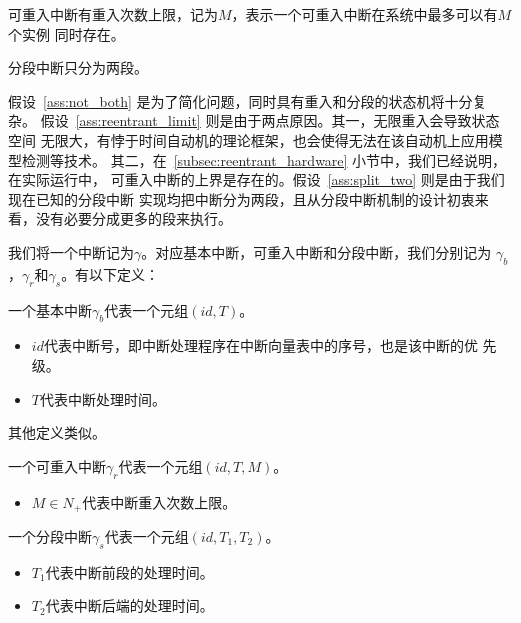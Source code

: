 \begin{assumption}
	\label{ass:reentrant_limit}
	可重入中断有重入次数上限，记为$M$，表示一个可重入中断在系统中最多可以有$M$个实例
	同时存在。
\end{assumption}

\begin{assumption}
	\label{ass:split_two}
	分段中断只分为两段。
\end{assumption}

假设~\ref{ass:not_both} 是为了简化问题，同时具有重入和分段的状态机将十分复杂。
假设~\ref{ass:reentrant_limit} 则是由于两点原因。其一，无限重入会导致状态空间
无限大，有悖于时间自动机的理论框架，也会使得无法在该自动机上应用模型检测等技术。
其二，在~\ref{subsec:reentrant_hardware} 小节中，我们已经说明，在实际运行中，
可重入中断的上界是存在的。假设~\ref{ass:split_two} 则是由于我们现在已知的分段中断
实现均把中断分为两段，且从分段中断机制的设计初衷来看，没有必要分成更多的段来执行。

我们将一个中断记为$\gamma$。对应基本中断，可重入中断和分段中断，我们分别记为
$\gamma_b$，$\gamma_r$和$\gamma_s$。有以下定义：

\begin{definition}
	\label{def:basic}
	一个基本中断$\gamma_b$代表一个元组$(id, T)$。
	\begin{itemize}
		\item $id$代表中断号，即中断处理程序在中断向量表中的序号，也是该中断的优
		先级。
		\item $T$代表中断处理时间。
	\end{itemize}
	其他定义类似。
\end{definition}

\begin{definition}
	\label{def:reentrant}
	一个可重入中断$\gamma_r$代表一个元组$(id, T, M)$。
	\begin{itemize}
		\item $M\in N_+$代表中断重入次数上限。
	\end{itemize}
\end{definition}

\begin{definition}
	\label{def:segment}
	一个分段中断$\gamma_s$代表一个元组$(id, T_1, T_2)$。
	\begin{itemize}
		\item $T_1$代表中断前段的处理时间。
		\item $T_2$代表中断后端的处理时间。
	\end{itemize}
\end{definition}

